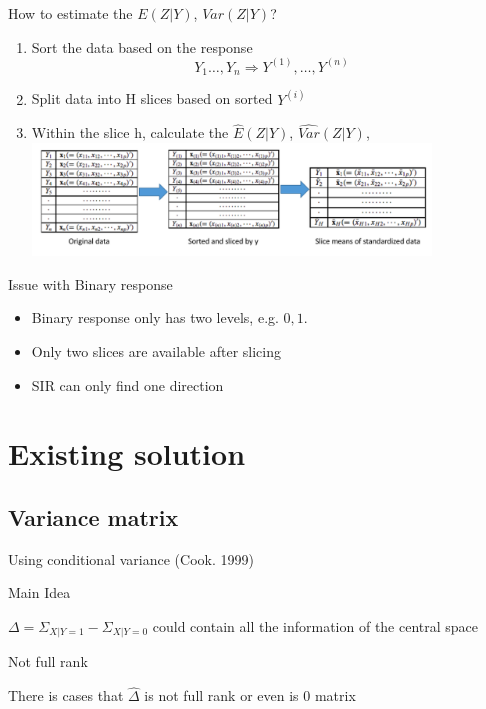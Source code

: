 \documentclass[ignorenonframetext,]{beamer}
\providecommand{\tightlist}{%
  \setlength{\itemsep}{0pt}\setlength{\parskip}{0pt}}
\begin{document}
\begin{frame}{How to estimate the \(E(Z|Y)\), \(Var(Z|Y)\)?}

\begin{enumerate}
\def\labelenumi{\arabic{enumi}.}
\tightlist
\item
  Sort the data based on the response \[
    Y_1 \dots, Y_n \Rightarrow Y^{(1)},\dots,Y^{(n)} 
  \]
\item
  Split data into H slices based on sorted \(Y^{(i)}\)
\item
  Within the slice h, calculate the \(\hat{E}(Z|Y)\),
  \(\hat{Var}(Z|Y)\),
  \includegraphics[width=4.16667in]{./pic/slice method.png}
\end{enumerate}

\end{frame}

\begin{frame}{Issue with Binary response}

\begin{itemize}
\item
  Binary response only has two levels, e.g. \(0,1\).
\item
  Only two slices are available after slicing
\item
  SIR can only find one direction
\end{itemize}

\end{frame}

\section{Existing solution}\label{existing-solution}

\subsection{Variance matrix}\label{variance-matrix}

\begin{frame}{Using conditional variance (Cook. 1999)}

\begin{block}{Main Idea}

\(\Delta = \Sigma_{X|Y = 1} - \Sigma_{X|Y = 0}\) could contain all the
information of the central space

\end{block}

\begin{block}{Not full rank}

There is cases that \(\hat \Delta\) is not full rank or even is 0 matrix

\end{block}

\end{frame}
\end{document}
